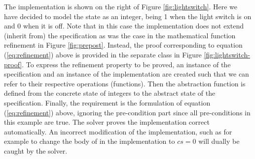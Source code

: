 The implementation is shown on the right of Figure \ref{fig:lightswitch}.
Here we have decided to model the state as an integer, being 1 when the light 
switch is on and 0 when it is off. Note that in this case the implementation
does not extend (inherit from) the specification as was the case in the 
mathematical function refinement in Figure \ref{fig:prepost}. Instead, the
proof corresponding to equation (\ref{eq:refinement}) above is provided
in the separate class  in Figure \ref{fig:lightswitch-proof}.
To express the refinement property to be proved, an instance  of the
specification and an instance  of the implementation are created such that we can refer to their respective operations (functions). Then the abstraction function  is defined from the concrete state of integers to the abstract state 
of the specification. Finally, the requirement is the \Klang{} formulation of 
equation (\ref{eq:refinement}) above, ignoring the pre-condition part since all
pre-conditions in this example are true. The \Klang{} solver proves the
implementation correct automatically. An incorrect modification of the implementation, such as for example to change the body of  in 
the implementation to $cs = 0$ will dually be caught by the solver.
